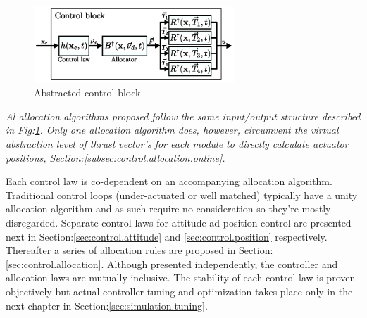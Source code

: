 \begin{figure}[htbp]
\centering
\includegraphics[width=0.67\textwidth]{figs/control-block}
\caption{Abstracted control block}
\label{fig:control-block}
\end{figure}
\par
\vspace{-10pt}
\emph{\color{Gray} Al allocation algorithms proposed follow the same input/output structure described in Fig:\ref{fig:control-block}. Only one allocation algorithm does, however, circumvent the virtual abstraction level of thrust vector's for each module to directly calculate actuator positions, Section:\ref{subsec:control.allocation.online}.}
\par
Each control law is co-dependent on an accompanying allocation algorithm. Traditional control loops (under-actuated or well matched) typically have a unity allocation algorithm and as such require no consideration so they're mostly disregarded. Separate control laws for attitude ad position control are presented next in Section:\ref{sec:control.attitude} and \ref{sec:control.position} respectively. Thereafter a series of allocation rules are proposed in Section:\ref{sec:control.allocation}. Although presented independently, the controller and allocation laws are mutually inclusive. The stability of each control law is proven objectively but actual controller tuning and optimization takes place only in the next chapter in Section:\ref{sec:simulation.tuning}.
\par
